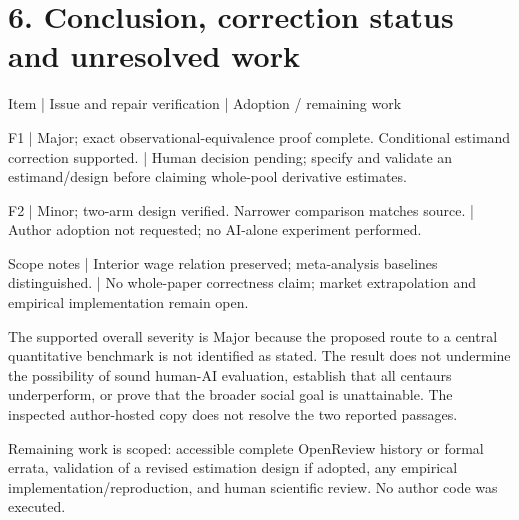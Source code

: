 \documentclass[10pt]{article}
\begin{document}
\section*{6. Conclusion, correction status and unresolved work}
Item | Issue and repair verification | Adoption / remaining work\par
F1 | Major; exact observational-equivalence proof complete. Conditional estimand correction supported. | Human decision pending; specify and validate an estimand/design before claiming whole-pool derivative estimates.\par
F2 | Minor; two-arm design verified. Narrower comparison matches source. | Author adoption not requested; no AI-alone experiment performed.\par
Scope notes | Interior wage relation preserved; meta-analysis baselines distinguished. | No whole-paper correctness claim; market extrapolation and empirical implementation remain open.\par
The supported overall severity is Major because the proposed route to a central quantitative benchmark is not identified as stated. The result does not undermine the possibility of sound human-AI evaluation, establish that all centaurs underperform, or prove that the broader social goal is unattainable. The inspected author-hosted copy does not resolve the two reported passages.\par
Remaining work is scoped: accessible complete OpenReview history or formal errata, validation of a revised estimation design if adopted, any empirical implementation/reproduction, and human scientific review. No author code was executed.\par
\end{document}

